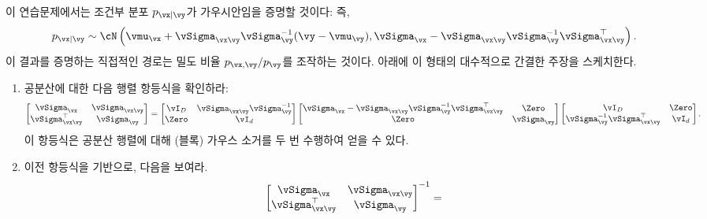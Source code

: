 \documentclass[../../book-main_ko.tex]{subfiles}
\begin{document}
\begin{exercise}
  이 연습문제에서는 조건부 분포 $p_{\vx \mid
  \vy}$가 가우시안임을 증명할 것이다: 즉,
  \begin{equation}\label{eq:gaussian-conditional-eqn}
    p_{\vx \mid \vy} \sim \cN\left(
      \vmu_{\vx} + \vSigma_{\vx\vy} \vSigma_{\vy}^{-1} (\vy - \vmu_{\vy}),
      \vSigma_{\vx} - \vSigma_{\vx\vy} \vSigma_{\vy}^{-1}
      \vSigma_{\vx\vy}^{\top}
    \right).
  \end{equation}
  이 결과를 증명하는 직접적인 경로는 밀도 비율 $p_{\vx, \vy} / p_{\vy}$를 조작하는 것이다. 아래에 이 형태의 대수적으로 간결한 주장을 스케치한다.

  \begin{enumerate}
    \item 공분산에 대한 다음 행렬 항등식을 확인하라:
      \begin{equation}\label{eq:gaussian-conditional-covariance-block}
        \begin{bmatrix}
          \vSigma_{\vx} & \vSigma_{\vx\vy} \\
          \vSigma_{\vx\vy}^\top & \vSigma_{\vy}
        \end{bmatrix}
        =
        \begin{bmatrix}
          \vI_D & \vSigma_{\vx\vy}\vSigma_{\vy}^{-1} \\
          \Zero & \vI_d
        \end{bmatrix}
        \begin{bmatrix}
          \vSigma_{\vx} - \vSigma_{\vx\vy} \vSigma_{\vy}^{-1}
          \vSigma_{\vx\vy}^{\top} & \Zero \\
          \Zero & \vSigma_{\vy}
        \end{bmatrix}
        \begin{bmatrix}
          \vI_D & \Zero\\
          \vSigma_{\vy}^{-1}\vSigma_{\vx\vy}^\top & \vI_d
        \end{bmatrix}.
      \end{equation}
      이 항등식은 공분산 행렬에 대해 (블록) 가우스 소거를 두 번 수행하여 얻을 수 있다.
    \item 이전 항등식을 기반으로, 다음을 보여라.
      \begin{equation}\label{eq:gaussian-conditional-covariance-inverse-block}
        \begin{bmatrix}
          \vSigma_{\vx} & \vSigma_{\vx\vy} \\
          \vSigma_{\vx\vy}^\top & \vSigma_{\vy}
        \end{bmatrix}^{-1}
        =

\end{equation}
\end{enumerate}
\end{exercise}
\end{document}
